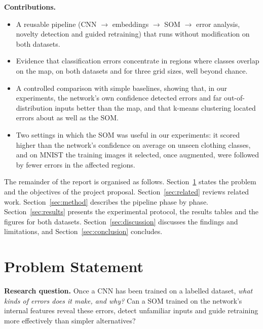 \documentclass{scrartcl}
\begin{document}
\textbf{Contributions.}
\begin{itemize}
  \item A reusable pipeline (CNN $\rightarrow$ embeddings $\rightarrow$ SOM $\rightarrow$ error analysis, novelty detection and guided retraining) that runs without modification on both datasets.
  \item Evidence that classification errors concentrate in regions where classes overlap on the map, on both datasets and for three grid sizes, well beyond chance.
  \item A controlled comparison with simple baselines, showing that, in our experiments, the network's own confidence detected errors and far out-of-distribution inputs better than the map, and that k-means clustering located errors about as well as the SOM.
  \item Two settings in which the SOM was useful in our experiments: it scored higher than the network's confidence on average on unseen clothing classes, and on MNIST the training images it selected, once augmented, were followed by fewer errors in the affected regions.
\end{itemize}

The remainder of the report is organised as follows. Section~\ref{sec:problem} states the problem and the objectives of the project proposal. Section~\ref{sec:related} reviews related work. Section~\ref{sec:method} describes the pipeline phase by phase. Section~\ref{sec:results} presents the experimental protocol, the results tables and the figures for both datasets. Section~\ref{sec:discussion} discusses the findings and limitations, and Section~\ref{sec:conclusion} concludes.

\section{Problem Statement}\label{sec:problem}

\textbf{Research question.} Once a CNN has been trained on a labelled dataset, \emph{what kinds of errors does it make, and why?} Can a SOM trained on the network's internal features reveal these errors, detect unfamiliar inputs and guide retraining more effectively than simpler alternatives?
\end{document}
